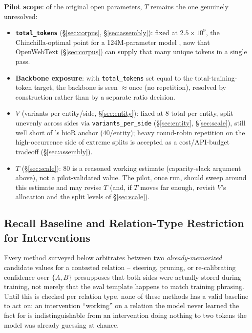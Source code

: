 \documentclass[11pt]{article}
\begin{document}
\textbf{Pilot scope}: of the original open parameters, $T$ remains the one
genuinely unresolved:
\begin{itemize}
  \item \textbf{\texttt{total\_tokens}} (\S\ref{sec:corpus},
    \S\ref{sec:assembly}): fixed at $2.5\times10^9$, the Chinchilla-optimal
    point for a 124M-parameter model \citep{hoffmann2022chinchilla}, now
    that OpenWebText (\S\ref{sec:corpus}) can supply that many unique tokens
    in a single pass.
  \item \textbf{Backbone exposure}: with \texttt{total\_tokens} set equal to
    the total-training-token target, the backbone is seen $\approx$once (no
    repetition), resolved by construction rather than by a separate ratio
    decision.
  \item \textbf{$V$} (variants per entity/side, \S\ref{sec:entity}): fixed
    at 8 total per entity, split unevenly across sides via
    \texttt{variants\_per\_side} (\S\ref{sec:entity}, \S\ref{sec:scale}),
    still well short of \citet{allenzhu2024capacity}'s bioR anchor
    (40/entity); heavy round-robin repetition on the high-occurrence side of
    extreme splits is accepted as a cost/API-budget tradeoff
    (\S\ref{sec:assembly}).
  \item \textbf{$T$} (\S\ref{sec:scale}): $80$ is a reasoned working
    estimate (capacity-slack argument above), not a pilot-validated value.
    The pilot, once run, should sweep around this estimate and may revise
    $T$ (and, if $T$ moves far enough, revisit $V$'s allocation and the
    split levels of \S\ref{sec:scale}).
\end{itemize}

\subsection{Recall Baseline and Relation-Type Restriction for Interventions}
\label{sec:relation-restriction}

Every method surveyed below arbitrates between two \emph{already-memorized}
candidate values for a contested relation -- steering, pruning, or
re-calibrating confidence over $\{A, B\}$ presupposes that both sides were
actually stored during training, not merely that the eval template happens
to match training phrasing. Until this is checked per relation type, none of
these methods has a valid baseline to act on: an intervention ``working'' on
a relation the model never learned the fact for is indistinguishable from an
intervention doing nothing to two tokens the model was already guessing at
chance.
\end{document}
